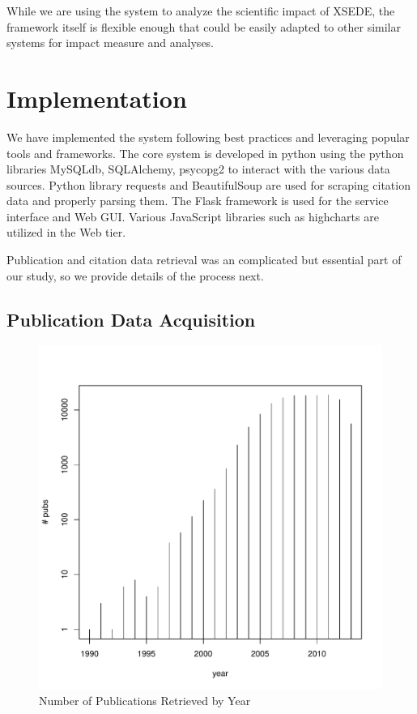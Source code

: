 \documentclass{sig-alternate}
\begin{document}
While we are using the system to analyze the scientific impact of XSEDE, the framework itself is flexible enough that could be easily adapted to other similar systems for impact measure and analyses. 
 
 
\section{Implementation} \label{S:implementation}
 
We have implemented the system following best practices and leveraging popular tools and frameworks. The core system is developed in python using the  python libraries MySQLdb, SQLAlchemy, psycopg2 to interact with the various data sources. Python library requests and BeautifulSoup are used for scraping citation data and properly parsing them. The Flask framework is used for the service interface and Web GUI. Various JavaScript libraries such as highcharts are utilized in the Web tier. 
 
Publication and citation data retrieval was an complicated but essential part of our study, so we provide details of the process next. 
 
\subsection{Publication Data Acquisition} 
 
\begin{figure}[!htb] 
  \centering 
    \includegraphics[width=1.0\columnwidth]{images/21_pubs_year_distribution.pdf} 
  \caption{Number of Publications Retrieved by Year}\label{F:pubs-year-distribution} 
\end{figure} 
 
\end{document}
